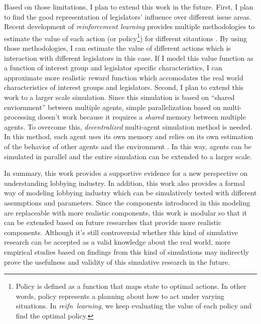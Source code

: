 \documentclass{article}
\begin{document}
Based on those limitations,
I plan to extend this work in the future. 
First, I plan to find the good representation of 
legislators' influence over different issue areas.
Recent development of 
\textit{reinforcement learning} 
provides multiple methodologies to estimate the value of each action (or policy\footnote{Policy is defined as a function that maps state to optimal actions. In other words, policy represents a planning about how to act under varying situations. In \textit{reifn\
 learning}, we keep evaluating the value of each policy and find the optimal policy.
 }) for different sitautions \citep{Sutton1998}.
By using those methodologies, 
I can estimate the value of different actions which is interaction with different legislators in this case.
If I model this value function 
as a function of interest group and legislator specific characteristics,
I can approximate more realistic reward function which accomodates the real world characteristics of interest groups and legislators.
Second, I plan to extend this work to a larger scale simulation. 
Since this simulation is based on ``shared enviornment'' between multiple agents, 
simple parallelization based on multi-processing doesn't work because it requires a \textit{shared} memory between
multiple agents. To overcome this, \textit{decentralized} multi-agent simulation method is needed.
In this method, each agent uses its own memory and relies on its own estimation of the behavior of other agents and the environment \citep{decen}.
In this way, agents can be simulated in parallel and the entire simulation can be extended to a larger scale.

In summary, this work provides 
a supportive evidence for a new perspective on understanding lobbying industry. 
In addition,
this work also provides a formal way of 
modeling lobbying industry which can be simulatively 
tested with different assumptions and parameters.
Since the components introduced in this modeling 
are replaceable with more realistic components,
this work is modular so that it can be extended based on 
future researches that provide more realistic components.
Although it's still controversial whether this kind of simulative research can 
be accepted as a valid knowledge about the real world,
more empirical studies based on findings from this kind of 
simulations may indirectly prove the 
usefulness and validity of this simulative research in the future.
\end{document}

